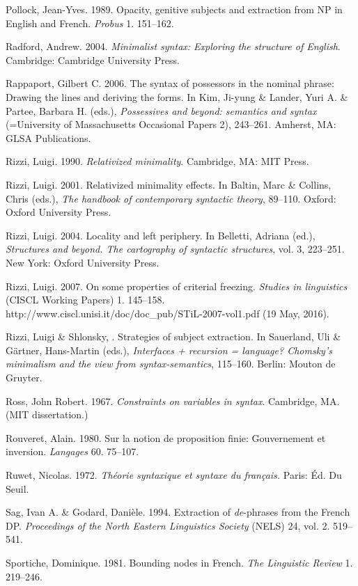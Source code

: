 \documentclass[output=paper]{langsci/langscibook}
\begin{document}
Pollock, Jean-Yves. 1989. Opacity, genitive subjects and extraction from NP in English and French. \textit{Probus} 1. 151–162.

Radford, Andrew. 2004. \textit{Minimalist syntax: Exploring the structure of English}. Cambridge: Cambridge University Press.

Rappaport, Gilbert C. 2006. The syntax of possessors in the nominal phrase: Drawing the lines and deriving the forms. In Kim, Ji-yung \& Lander, Yuri A. \& Partee, Barbara H. (eds.), \textit{Possessives and beyond: semantics and syntax} (=University of Massachusetts Occasional Papers 2), 243–261. Amherst, MA: GLSA Publications.

Rizzi, Luigi. 1990. \textit{Relativized minimality}. Cambridge, MA: MIT Press.

Rizzi, Luigi. 2001. Relativized minimality effects. In Baltin, Marc \& Collins, Chris (eds.), \textit{The handbook of contemporary syntactic theory}, 89–110. Oxford: Oxford University Press.

Rizzi, Luigi. 2004. Locality and left periphery. In Belletti, Adriana (ed.), \textit{Structures and beyond. The cartography of syntactic structures}, vol. 3, 223–251. New York: Oxford University Press.

Rizzi, Luigi. 2007. On some properties of criterial freezing. \textit{Studies in linguistics} (CISCL Working Papers) 1. 145–158. http://www.ciscl.unisi.it/doc/doc\_pub/STiL-2007-vol1.pdf (19 May, 2016).

Rizzi, Luigi \& Shlonsky, \citealt{Ur2007}. Strategies of subject extraction. In Sauerland, Uli \& Gärtner, Hans-Martin (eds.), \textit{Interfaces + recursion = language? Chomsky’s minimalism and the view from syntax-semantics}, 115–160. Berlin: Mouton de Gruyter.

Ross, John Robert. 1967. \textit{Constraints on variables in syntax}. Cambridge, MA. (MIT dissertation.)

Rouveret, Alain. 1980. Sur la notion de proposition finie: Gouvernement et inversion. \textit{Langages} 60. 75–107.

Ruwet, Nicolas. 1972. \textit{Théorie syntaxique et syntaxe du français.} Paris: Éd. Du Seuil.

Sag, Ivan A. \& Godard, Danièle. 1994. Extraction of \textit{de}{}-phrases from the French DP. \textit{Proceedings of the North Eastern Linguistics Society} (NELS) 24, vol. 2. 519–541.

Sportiche, Dominique. 1981. Bounding nodes in French. \textit{The Linguistic Review} 1. 219–246.
\end{document}
